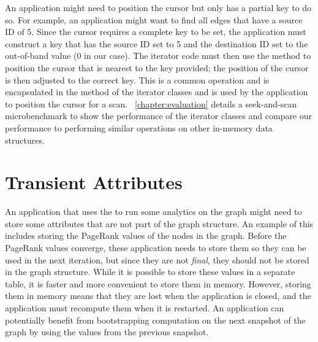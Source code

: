 An application might need to position the cursor but only has a partial key to do so.
For example, an application might want to find all edges that have a source ID of 5.
Since the \wt{} cursor requires a complete key to be set, the application must construct a key that has the source ID set to 5 and the destination ID set to the out-of-band value (0 in our case).
The iterator code must then use the \wt{}  method to position the cursor that is nearest to the key provided; the position of the cursor is then adjusted to the correct key.
This is a common operation and is encapsulated in the  method of the iterator classes and is used by the application to position the cursor for a scan.
~\autoref{chapter:evaluation} details a seek-and-scan microbenchmark to show the performance of the iterator classes and compare our performance to performing similar operations on other in-memory data structures.

\section{Transient Attributes}
\label{arch:transient-attrs}
An application that uses the \api{} to run some analytics on the graph might need to store some attributes that are not part of the graph structure.
An example of this includes storing the PageRank values of the nodes in the graph.
Before the PageRank values converge, these application needs to store them so they can be used in the next iteration, but since they are not \emph{final}, they should not be stored in the graph structure.
While it is possible to store these values in a separate table, it is faster and more convenient to store them in memory.
However, storing them in memory means that they are lost when the application is closed, and the application must recompute them when it is restarted.
An application can potentially benefit from bootstrapping computation on the next snapshot of the graph by using the values from the previous snapshot.

